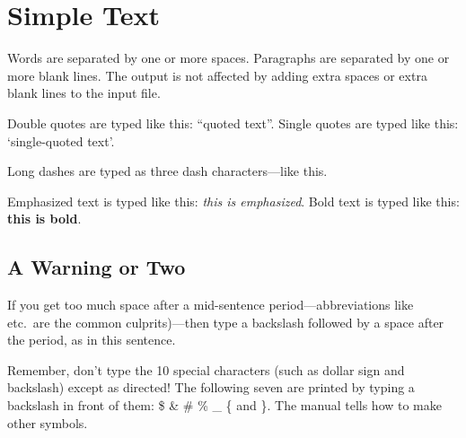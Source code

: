 \documentclass{article}
\begin{document}
	
	\section{Simple Text}
	
	Words are separated by one or more spaces.  Paragraphs are separated by
	one or more blank lines.  The output is not affected by adding extra
	spaces or extra blank lines to the input file.
	
	Double quotes are typed like this: ``quoted text''.
	Single quotes are typed like this: `single-quoted text'.
	
	Long dashes are typed as three dash characters---like this.
	
	Emphasized text is typed like this: \emph{this is emphasized}.
	Bold       text is typed like this: \textbf{this is bold}.
	
	\subsection{A Warning or Two} 
	
	If you get too much space after a mid-sentence period---abbreviations
	like etc.\ are the common culprits)---then type a backslash followed by
	a space after the period, as in this sentence.
	
	Remember, don't type the 10 special characters (such as dollar sign and
	backslash) except as directed!  The following seven are printed by
	typing a backslash in front of them:  \$  \&  \#  \%  \_  \{  and  \}.  
	The manual tells how to make other symbols.
	
\end{document}
